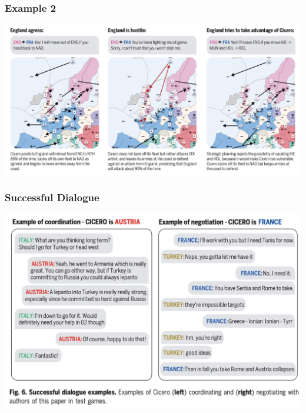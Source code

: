 \documentclass[xcolor=dvipsnames]{beamer}
\newcommand{\0}{\vec{0}}
\begin{document}
\begin{frame}
	\frametitle{Example 2}
	\begin{center}
		\includegraphics[width=\textwidth]{Bakhtin4}
	\end{center}
\end{frame}
\begin{frame}
	\frametitle{Successful Dialogue}
	\begin{center}
		\includegraphics[scale=0.4]{Bakhtin2}
	\end{center}
\end{frame}
\end{document}

